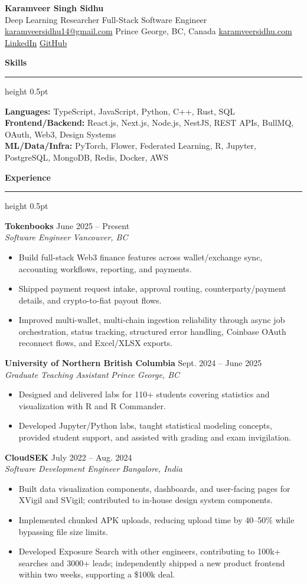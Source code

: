 \documentclass[10pt,letterpaper]{article}
\newcommand{\sectiontitle}[1]{%
  \vspace{6pt}
  {\large\bfseries\color{accent}#1}
  \vspace{2pt}
  \hrule height 0.5pt
  \vspace{4pt}
}
\newcommand{\roleentry}[4]{%
  \textbf{#1} \hfill {\small #2}\\
  \textit{#3} \hfill {\small \textit{#4}}
}
\begin{document}
\begin{center}
  {\LARGE \textbf{Karamveer Singh Sidhu}}\\[-1pt]
  {\normalsize Deep Learning Researcher \textbar{} Full-Stack Software Engineer}\\[2pt]
  \href{mailto:karamveersidhu14@gmail.com}{karamveersidhu14@gmail.com}
  \textbar{} Prince George, BC, Canada
  \textbar{} \href{https://karamveersidhu.com}{karamveersidhu.com}
  \textbar{} \href{https://www.linkedin.com/in/karamveersidhu/}{LinkedIn}
  \textbar{} \href{https://github.com/KaramveerSidhu}{GitHub}
\end{center}

\sectiontitle{Skills}
\textbf{Languages:} TypeScript, JavaScript, Python, C++, Rust, SQL \\
\textbf{Frontend/Backend:} React.js, Next.js, Node.js, NestJS, REST APIs, BullMQ, OAuth, Web3, Design Systems \\
\textbf{ML/Data/Infra:} PyTorch, Flower, Federated Learning, R, Jupyter, PostgreSQL, MongoDB, Redis, Docker, AWS

\sectiontitle{Experience}
\roleentry{Tokenbooks}{June 2025 -- Present}{Software Engineer}{Vancouver, BC}
\begin{itemize}
  \item Build full-stack Web3 finance features across wallet/exchange sync, accounting workflows, reporting, and payments.
  \item Shipped payment request intake, approval routing, counterparty/payment details, and crypto-to-fiat payout flows.
  \item Improved multi-wallet, multi-chain ingestion reliability through async job orchestration, status tracking, structured error handling, Coinbase OAuth reconnect flows, and Excel/XLSX exports.
\end{itemize}

\roleentry{University of Northern British Columbia}{Sept. 2024 -- June 2025}{Graduate Teaching Assistant}{Prince George, BC}
\begin{itemize}
  \item Designed and delivered labs for 110+ students covering statistics and visualization with R and R Commander.
  \item Developed Jupyter/Python labs, taught statistical modeling concepts, provided student support, and assisted with grading and exam invigilation.
\end{itemize}

\roleentry{CloudSEK}{July 2022 -- Aug. 2024}{Software Development Engineer}{Bangalore, India}
\begin{itemize}
  \item Built data visualization components, dashboards, and user-facing pages for XVigil and SVigil; contributed to in-house design system components.
  \item Implemented chunked APK uploads, reducing upload time by 40--50\% while bypassing file size limits.
  \item Developed Exposure Search with other engineers, contributing to 100k+ searches and 3000+ leads; independently shipped a new product frontend within two weeks, supporting a \$100k deal.
\end{itemize}
\end{document}
